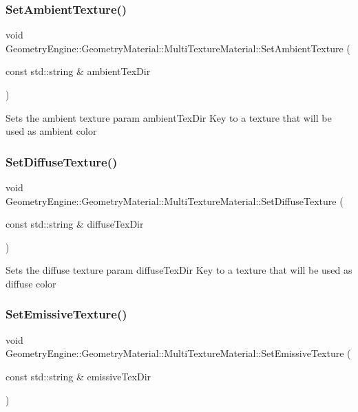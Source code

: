 \subsubsection{\texorpdfstring{SetAmbientTexture()}{SetAmbientTexture()}}
{\footnotesize\ttfamily void Geometry\+Engine\+::\+Geometry\+Material\+::\+Multi\+Texture\+Material\+::\+Set\+Ambient\+Texture (\begin{DoxyParamCaption}\item[{const std\+::string \&}]{ambient\+Tex\+Dir }\end{DoxyParamCaption})}

Sets the ambient texture param ambient\+Tex\+Dir Key to a texture that will be used as ambient color \mbox{\label{class_geometry_engine_1_1_geometry_material_1_1_multi_texture_material_a51249ca0c845bfd39ea3ddc90254092d}} 
\subsubsection{\texorpdfstring{SetDiffuseTexture()}{SetDiffuseTexture()}}
{\footnotesize\ttfamily void Geometry\+Engine\+::\+Geometry\+Material\+::\+Multi\+Texture\+Material\+::\+Set\+Diffuse\+Texture (\begin{DoxyParamCaption}\item[{const std\+::string \&}]{diffuse\+Tex\+Dir }\end{DoxyParamCaption})}

Sets the diffuse texture param diffuse\+Tex\+Dir Key to a texture that will be used as diffuse color \mbox{\label{class_geometry_engine_1_1_geometry_material_1_1_multi_texture_material_ad0ca544526e65dcd519cd0e82fc4bc7f}} 
\subsubsection{\texorpdfstring{SetEmissiveTexture()}{SetEmissiveTexture()}}
{\footnotesize\ttfamily void Geometry\+Engine\+::\+Geometry\+Material\+::\+Multi\+Texture\+Material\+::\+Set\+Emissive\+Texture (\begin{DoxyParamCaption}\item[{const std\+::string \&}]{emissive\+Tex\+Dir }\end{DoxyParamCaption})}

